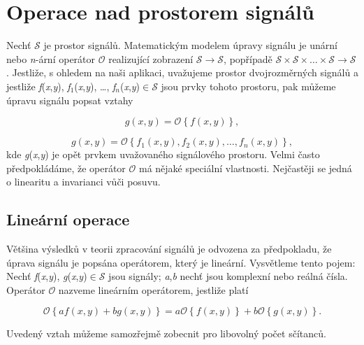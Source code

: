 \section*{Operace nad prostorem signálů}

Nechť $\mathscr{S}$ je prostor signálů. Matematickým modelem úpravy signálu je unární nebo \textit{n}-ární operátor $\mathscr{O}$ realizující zobrazení $\mathscr{S} \rightarrow \mathscr{S}$, popřípadě $\mathscr{S}\times\mathscr{S}\times\dots\times\mathscr{S} \rightarrow \mathscr{S}$. Jestliže, s ohledem na naši aplikaci, uvažujeme prostor dvojrozměrných signálů a jestliže \textit{f}(\textit{x},\textit{y}), \textit{f}$_1$(\textit{x},\textit{y}), \dots, \textit{f}$_n$(\textit{x},\textit{y})$\in \mathscr{S}$ jsou prvky tohoto prostoru, pak můžeme úpravu signálu popsat vztahy

\begin{equation} \label{eq:1_36}
    g(x, y) = \mathscr{O}\left\{ f(x, y) \right\},
\end{equation}

\begin{equation} \label{eq:1_37}
    g(x, y) = \mathscr{O}\left\{ f_1(x, y), f_2(x, y), \ldots, f_n(x, y) \right\},
\end{equation}
kde \textit{g}(\textit{x},\textit{y}) je opět prvkem uvažovaného signálového prostoru. Velmi často předpokládáme, že operátor $\mathscr{O}$ má nějaké speciální vlastnosti. Nejčastěji se jedná o linearitu a invarianci vůči posuvu.

\subsection*{Lineární operace}

Většina výsledků v teorii zpracování signálů je odvozena za předpokladu, že úprava signálu je popsána operátorem, který je lineární. Vysvětleme tento pojem: Nechť \textit{f}(\textit{x},\textit{y}), \textit{g}(\textit{x},\textit{y})$\in \mathscr{S}$ jsou signály; \textit{a},\textit{b} nechť jsou komplexní nebo reálná čísla. Operátor $\mathscr{O}$ nazveme lineárním operátorem, jestliže platí

\begin{equation} \label{eq:1_38}
    \mathscr{O} \left\{ a f(x, y) + b g(x, y) \right\} = a \mathscr{O}\left\{ f(x, y) \right\} + b \mathscr{O} \left\{ g(x, y) \right\}.
\end{equation}

Uvedený vztah můžeme samozřejmě zobecnit pro libovolný počet sčítanců.

